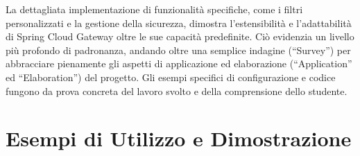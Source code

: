 La dettagliata implementazione di funzionalità specifiche, come i filtri personalizzati e la gestione della sicurezza, dimostra l'estensibilità e l'adattabilità di Spring Cloud Gateway oltre le sue capacità predefinite. Ciò evidenzia un livello più profondo di padronanza, andando oltre una semplice indagine (\enquote{Survey}) per abbracciare pienamente gli aspetti di applicazione ed elaborazione (\enquote{Application} ed \enquote{Elaboration}) del progetto. Gli esempi specifici di configurazione e codice fungono da prova concreta del lavoro svolto e della comprensione dello studente.

\section{Esempi di Utilizzo e Dimostrazione}

